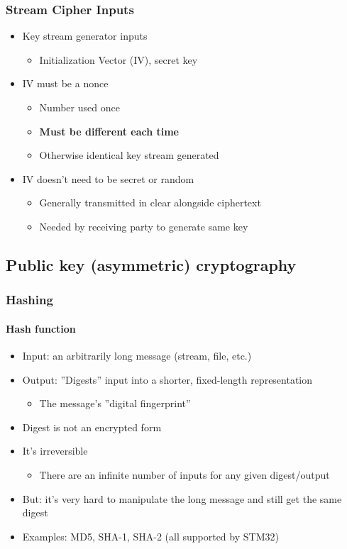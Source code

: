 \subsubsection{Stream Cipher Inputs}
\begin{itemize}
  \item Key stream generator inputs
  \begin{itemize}
    \item Initialization Vector (IV), secret key
  \end{itemize}
  \item IV must be a nonce
  \begin{itemize}
    \item Number used once
    \item \textbf{Must be different each time}
    \item Otherwise identical key stream generated
  \end{itemize}
  \item IV doesn't need to be secret or random
  \begin{itemize}
    \item Generally transmitted in clear alongside ciphertext
    \item Needed by receiving party to generate same key
  \end{itemize}
\end{itemize}

\subsection{Public key (asymmetric) cryptography}

\subsubsection{Hashing}
\paragraph{Hash function}
\begin{itemize}
  \item Input: an arbitrarily long message (stream, file, etc.)
  \item Output: ''Digests'' input into a shorter, fixed-length representation
  \begin{itemize}
    \item The message's ''digital fingerprint''
  \end{itemize}
  \item Digest is not an encrypted form
  \item It's irreversible
  \begin{itemize}
    \item There are an infinite number of inputs for any given digest/output
  \end{itemize}
  \item But: it's very hard to manipulate the long message and still get the same digest
  \item Examples: MD5, SHA-1, SHA-2 (all supported by STM32)
\end{itemize}

